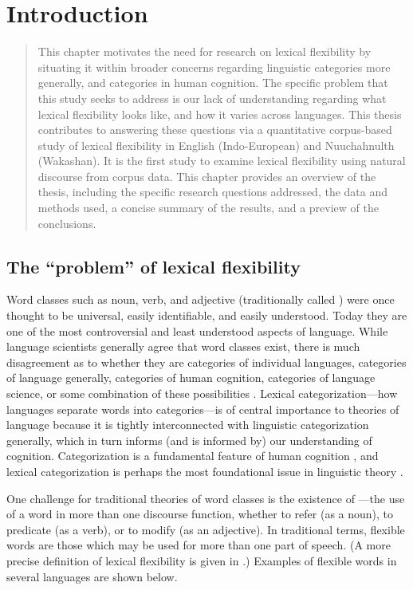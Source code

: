 \chapter{Introduction}
\label{ch:introduction}

\blockquote{This chapter motivates the need for research on lexical flexibility by situating it within broader concerns regarding linguistic categories more generally, and categories in human cognition. The specific problem that this study seeks to address is our lack of understanding regarding what lexical flexibility looks like, and how it varies across languages. This thesis contributes to answering these questions via a quantitative corpus-based study of lexical flexibility in English (Indo-European) and Nuuchahnulth (Wakashan). It is the first study to examine lexical flexibility using natural discourse from corpus data. This chapter provides an overview of the thesis, including the specific research questions addressed, the data and methods used, a concise summary of the results, and a preview of the conclusions.}

\section{The \enquote{problem} of lexical flexibility}
\label{sec:1.1}

Word classes such as noun, verb, and adjective (traditionally called ) were once thought to be universal, easily identifiable, and easily understood. Today they are one of the most controversial and least understood aspects of language. While language scientists generally agree that word classes exist, there is much disagreement as to whether they are categories of individual languages, categories of language generally, categories of human cognition, categories of language science, or some combination of these possibilities . Lexical categorization—how languages separate words into categories—is of central importance to theories of language because it is tightly interconnected with linguistic categorization generally, which in turn informs (and is informed by) our understanding of cognition. Categorization is a fundamental feature of human cognition , and lexical categorization is perhaps the most foundational issue in linguistic theory .

One challenge for traditional theories of word classes is the existence of —the use of a word in more than one discourse function, whether to refer (as a noun), to predicate (as a verb), or to modify (as an adjective). In traditional terms, flexible words are those which may be used for more than one part of speech. (A more precise definition of lexical flexibility is given in .) Examples of flexible words in several languages are shown below.

